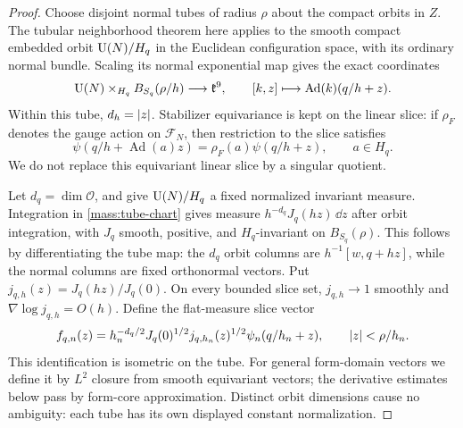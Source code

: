 \begin{proof}
Choose disjoint normal tubes of radius \(\rho\) about the compact
orbits in \(Z\). The tubular neighborhood theorem here applies to
the smooth compact embedded orbit \(\operatorname{U}(N)/H_q\) in the Euclidean
configuration space, with its ordinary normal bundle. Scaling its
normal exponential map gives the exact coordinates
\begin{equation}
\label{mass:tube-chart}
 \operatorname{U}(N)\times_{H_q}B_{S_q}(\rho/h)
 \longrightarrow\mathfrak k^9,
 \qquad [k,z]\longmapsto\operatorname{Ad}(k)(q/h+z).
\end{equation}
Within this tube, \(d_h=\left\lvert z\right\rvert\). Stabilizer equivariance is kept
on the linear slice: if \(\rho_F\) denotes the gauge action on
\(\mathcal F_N\), then restriction to the slice satisfies
\[
 \psi(q/h+\operatorname{Ad}(a)z)=\rho_F(a)\psi(q/h+z),
 \qquad a\in H_q.
\]
We do not replace this equivariant linear slice by a singular
quotient.

Let \(d_q=\dim\mathcal O\), and give \(\operatorname{U}(N)/H_q\) a fixed
normalized invariant measure. Integration in
\eqref{mass:tube-chart} gives measure
\(h^{-d_q}J_q(hz)\,\dd z\) after orbit integration, with
\(J_q\) smooth, positive, and \(H_q\)-invariant on
\(B_{S_q}(\rho)\). This follows by differentiating the tube map:
the \(d_q\) orbit columns are
\(h^{-1}[w,q+hz]\), while the normal columns are fixed orthonormal
vectors. Put
\(j_{q,h}(z)=J_q(hz)/J_q(0)\). On every bounded slice set,
\(j_{q,h}\to1\) smoothly and
\(\nabla\log j_{q,h}=O(h)\). Define the flat-measure slice vector
\begin{equation}
\label{mass:slice-normalization}
 f_{q,n}(z)=
 h_n^{-d_q/2}J_q(0)^{1/2}j_{q,h_n}(z)^{1/2}
 \psi_n(q/h_n+z),\qquad \left\lvert z\right\rvert<\rho/h_n.
\end{equation}
This identification is isometric on the tube. For general form-domain
vectors we define it by \(L^2\) closure from smooth equivariant
vectors; the derivative estimates below pass by form-core
approximation. Distinct orbit dimensions cause no ambiguity: each
tube has its own displayed constant normalization.


\end{proof}
